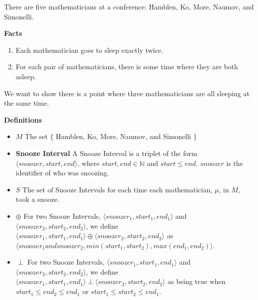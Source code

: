 \documentclass[fleqn]{article}
\newcommand{\triple}[3]{\langle #1,#2,#3 \rangle}
\newcommand{\iunion}{\oplus}
\newcommand{\ioverlap}{\perp}
\begin{document}
There are five mathematicians at a conference: Hamblen, Ko, More, Naumov, and Simonelli.

\textbf{Facts}
\begin{enumerate}
  \item  Each mathematician goes to sleep exactly twice.

  \item  For each pair of mathematicians, there is some time where
         they are both asleep.
\end{enumerate}

We want to show there is a point where three mathematicians are all sleeping at the same time.

\textbf{Definitions}
\begin{itemize}
  \item \textbf{$M$} The set $\lbrace$ Hamblen, Ko, More, Naumov, and Simonelli $\rbrace$
  \item \textbf{Snooze Interval} A Snooze Interval is a triplet of
        the form $\triple{snoozer}{start}{end}$, where $start, end \in \mathbb{N}$ and $start \leq end$. $snoozer$ is the identifier of who was snoozing.
  \item \textbf{$S$} The set of Snooze Intervals for each time each mathematician, $\mu$, in $M$, took a snooze.
  \item \textbf{$\iunion$} For two Snooze Intervals,
                         $\triple{snoozer_1}{start_1}{end_1}$ and
                         $\triple{snoozer_2}{start_2}{end_2}$, we define
                         $\triple{snoozer_1}{start_1}{end_1} \iunion
                          \triple{snoozer_2}{start_2}{end_2}$ as
                         $\triple{snoozer_1 and snoozer_2}
                                 {min(start_1, start_2)}
                                 {max(end_1,end_2)}$.

  \item \textbf{$\ioverlap$} For two Snooze Intervals,
                         $\triple{snoozer_1}{start_1}{end_1}$ and
                         $\triple{snoozer_2}{start_2}{end_2}$, we define
                         $\triple{snoozer_1}{start_1}{end_1} \ioverlap
                          \triple{snoozer_2}{start_2}{end_2}$ as being true
                         when $start_1 \leq end_2 \leq end_1$ or
                              $start_1 \leq start_2 \leq end_1$.


\end{itemize}
\end{document}
